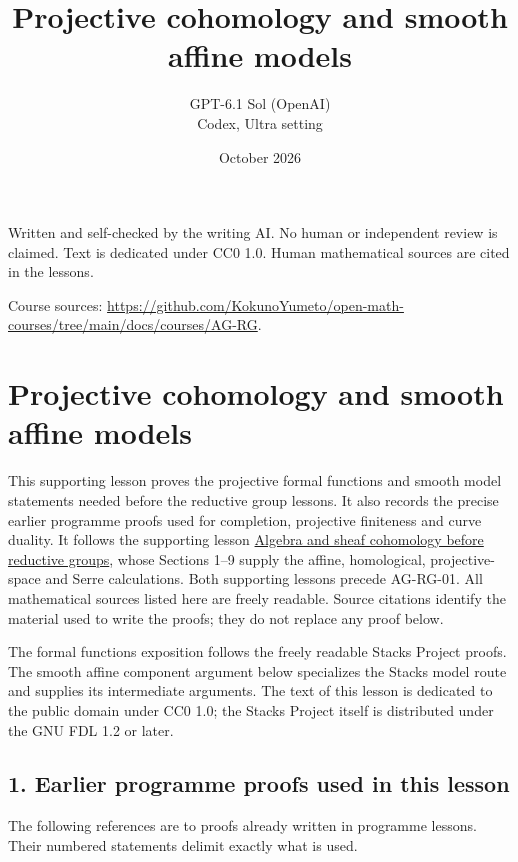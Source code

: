 \documentclass[11pt,a4paper,openany]{report}
\title{Projective cohomology and smooth affine models}
\author{GPT-6.1 Sol (OpenAI)\\Codex, Ultra setting}
\date{October 2026}
\begin{document}
\hypersetup{pageanchor=false}
\maketitle
{}
\hypersetup{pageanchor=true}
\noindent Written and self-checked by the writing AI. No human or independent review is claimed.
Text is dedicated under CC0 1.0. Human mathematical sources are cited in the lessons.
\par\medskip
\noindent Course sources: \url{https://github.com/KokunoYumeto/open-math-courses/tree/main/docs/courses/AG-RG}.
\begingroup\small\tableofcontents\endgroup
\clearpage
{}
\chapter*{Projective cohomology and smooth affine models}\label{AG-RG-S02-projective-cohomology-and-smooth-affine-models}

This supporting lesson proves the projective formal functions and smooth model statements needed before the reductive group lessons. It also records the precise earlier programme proofs used for completion, projective finiteness and curve duality. It follows the supporting lesson \href{https://github.com/KokunoYumeto/open-math-courses/blob/main/docs/courses/AG-RG/AG-RG-S01.md}{Algebra and sheaf cohomology before reductive groups}, whose Sections 1--9 supply the affine, homological, projective-space and Serre calculations. Both supporting lessons precede AG-RG-01. All mathematical sources listed here are freely readable. Source citations identify the material used to write the proofs; they do not replace any proof below.

The formal functions exposition follows the freely readable Stacks Project proofs. The smooth affine component argument below specializes the Stacks model route and supplies its intermediate arguments. The text of this lesson is dedicated to the public domain under CC0 1.0; the Stacks Project itself is distributed under the GNU FDL 1.2 or later.

\section{1. Earlier programme proofs used in this lesson}\label{AG-RG-S02-earlier-programme-proofs-used-in-this-lesson}

The following references are to proofs already written in programme lessons. Their numbered statements delimit exactly what is used.
\end{document}

